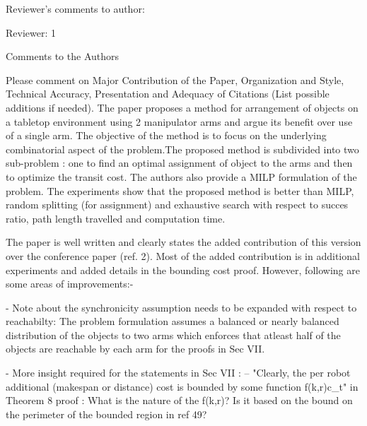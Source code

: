 \documentclass[journal]{IEEEtran}
\begin{document}
	\begin{partt}
		Reviewer's comments to author:
		
		Reviewer: 1
		
		Comments to the Authors
		
		Please comment on Major Contribution of the Paper, Organization and Style, Technical Accuracy, Presentation and Adequacy of Citations (List possible additions if needed).
		The paper proposes a method for arrangement of objects on a tabletop environment using 2 manipulator arms and argue its benefit over use of a single arm. The objective of the method is to focus on the underlying combinatorial aspect of the problem.The proposed method is subdivided into two sub-problem : one to find an optimal assignment of object to the arms and then to optimize the transit cost. The authors also provide a MILP formulation of the problem. The experiments show that the proposed method is better than MILP, random splitting (for assignment) and exhaustive search with respect to succes ratio, path length travelled and computation time.
		
		The paper is well written and clearly states the added contribution of this version over the conference paper (ref. 2). Most of the added contribution is in additional experiments and added details in the bounding cost proof. However, following are some areas of improvements:-
		
	\end{partt}
	\begin{partt}	
		- Note about the synchronicity assumption needs to be expanded with respect to reachabilty: The problem formulation assumes a balanced or nearly balanced distribution of the objects to two arms which enforces that atleast half of the objects are reachable by each arm for the proofs in Sec VII.
	\end{partt}
	\begin{partt}
		
		- More insight required for the statements in Sec VII :
		-- "Clearly, the per robot additional (makespan or distance) cost is bounded by some function f(k,r)c\_t" in Theorem 8 proof : What is the nature of the f(k,r)? Is it based on the bound on the perimeter of the bounded region in ref 49?
	\end{partt}
\end{document}
